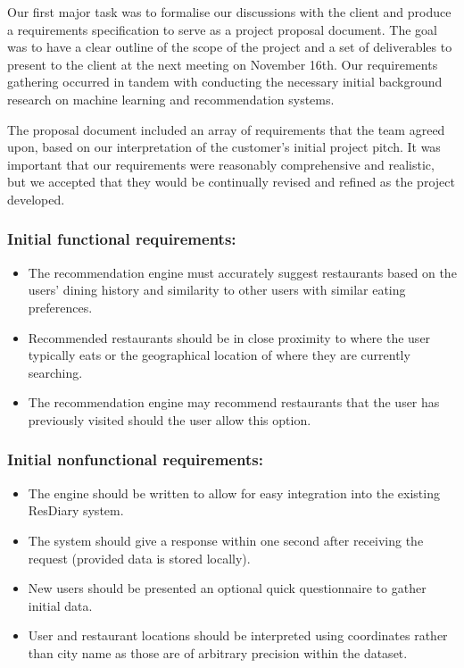 \documentclass{l3proj}
\begin{document}
Our first major task was to formalise our discussions with the client and produce a requirements specification to serve as a project proposal document. The goal was to have a clear outline of the scope of the project and a set of deliverables to present to the client at the next meeting on November 16th. Our requirements gathering occurred in tandem with conducting the necessary initial background research on machine learning and recommendation systems. 

The proposal document included an array of requirements that the team agreed upon, based on our interpretation of the customer's initial project pitch. It was important that our requirements were reasonably comprehensive and realistic, but we accepted that they would be continually revised and refined as the project developed. 

\subsubsection{Initial functional requirements:}
\begin{itemize}
\item The recommendation engine must accurately suggest restaurants based on the users' dining history and similarity to other users with similar eating preferences.
\item Recommended restaurants should be in close proximity to where the user typically eats or the geographical location of where they are currently searching.
\item The recommendation engine may recommend restaurants that  the user has previously visited should the user allow this option.
\end{itemize}

\subsubsection{Initial nonfunctional requirements:}
\begin{itemize}
\item The engine should be written to allow for easy integration into the existing ResDiary system.
\item The system should give a response within one second after receiving the request (provided data is stored locally).
\item New users should be presented an optional quick questionnaire to gather initial data.
\item User and restaurant locations should be interpreted using coordinates rather than city name as those are of arbitrary precision within the dataset.
\end{itemize}
\end{document}
